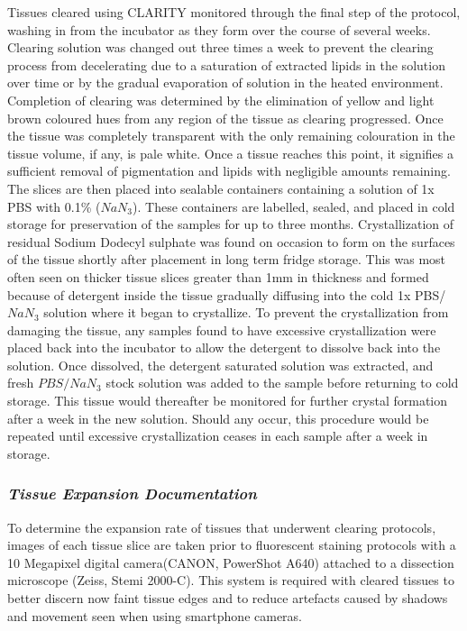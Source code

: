 Tissues cleared using CLARITY monitored through the final step of the protocol, washing in from the incubator as they form over the course of several weeks. Clearing solution was changed out three times a week to prevent the clearing process from decelerating due to a saturation of extracted lipids in the solution over time or by the gradual evaporation of solution in the heated environment. 
Completion of clearing was determined by the elimination of yellow and light brown coloured hues from any region of the tissue as clearing progressed. Once the tissue was completely transparent with the only remaining colouration in the tissue volume, if any, is pale white. Once a tissue reaches this point, it signifies a sufficient removal of pigmentation and lipids with negligible amounts remaining. The slices are then placed into sealable containers containing a solution of 1x PBS with 0.1\% (\(NaN_3\)). These containers are labelled, sealed, and placed in cold storage for preservation of the samples for up to three months.   
Crystallization of residual Sodium Dodecyl sulphate was found on occasion to form on the surfaces of the tissue shortly after placement in long term fridge storage. This was most often seen on thicker tissue slices greater than 1mm in thickness and formed because of detergent inside the tissue gradually diffusing into the cold 1x PBS/\(NaN_3\) solution where it began to crystallize. To prevent the crystallization from damaging the tissue, any samples found to have excessive crystallization were placed back into the incubator to allow the detergent to dissolve back into the solution. Once dissolved, the detergent saturated solution was extracted, and fresh \(PBS/NaN_3\) stock solution was added to the sample before returning to cold storage. This tissue would thereafter be monitored for further crystal formation after a week in the new solution. Should any occur, this procedure would be repeated until excessive crystallization ceases in each sample after a week in storage.

\subsubsection{\textit{Tissue Expansion Documentation}}

To determine the expansion rate of tissues that underwent clearing protocols, images of each tissue slice are taken prior to fluorescent staining protocols with a 10 Megapixel digital camera(CANON, PowerShot A640) attached to a dissection microscope (Zeiss, Stemi 2000-C). This system is required with cleared tissues to better discern now faint tissue edges and to reduce artefacts caused by shadows and movement seen when using smartphone cameras. 

